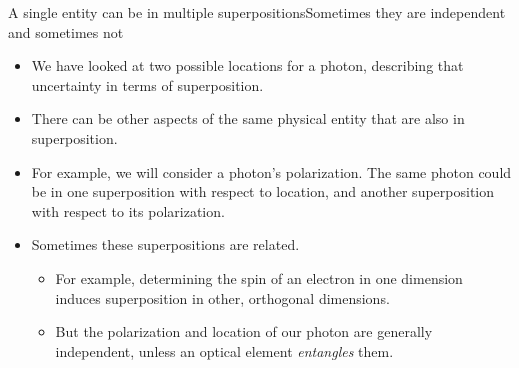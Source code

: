 \begin{frame}{A single entity can be in multiple superpositions}{Sometimes they are independent and sometimes not}
\begin{itemize}
    \item We have looked at two possible locations for a photon, describing that uncertainty in terms of superposition.
    \item There can be other aspects of the same physical entity that are also in superposition.
    \item For example, we will consider a photon's polarization.  The same photon could be in one superposition with respect to location, and another superposition with respect to its polarization.
    \item Sometimes these superpositions are related.
    \begin{itemize}
        \item For example, determining the spin of an electron in one dimension induces superposition in other, orthogonal dimensions.
        \item But the polarization and location of our photon are generally independent, unless an optical element \emph{entangles} them.
    \end{itemize}
\end{itemize}
\end{frame}

